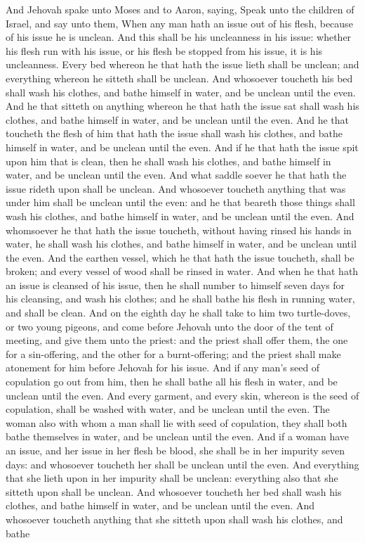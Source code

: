 And Jehovah spake unto Moses and to Aaron, saying, Speak unto the children of Israel, and say unto them, When any man hath an issue out of his flesh, because of his issue he is unclean. And this shall be his uncleanness in his issue: whether his flesh run with his issue, or his flesh be stopped from his issue, it is his uncleanness. Every bed whereon he that hath the issue lieth shall be unclean; and everything whereon he sitteth shall be unclean. And whosoever toucheth his bed shall wash his clothes, and bathe himself in water, and be unclean until the even. And he that sitteth on anything whereon he that hath the issue sat shall wash his clothes, and bathe himself in water, and be unclean until the even. And he that toucheth the flesh of him that hath the issue shall wash his clothes, and bathe himself in water, and be unclean until the even. And if he that hath the issue spit upon him that is clean, then he shall wash his clothes, and bathe himself in water, and be unclean until the even. And what saddle soever he that hath the issue rideth upon shall be unclean. And whosoever toucheth anything that was under him shall be unclean until the even: and he that beareth those things shall wash his clothes, and bathe himself in water, and be unclean until the even. And whomsoever he that hath the issue toucheth, without having rinsed his hands in water, he shall wash his clothes, and bathe himself in water, and be unclean until the even. And the earthen vessel, which he that hath the issue toucheth, shall be broken; and every vessel of wood shall be rinsed in water.  And when he that hath an issue is cleansed of his issue, then he shall number to himself seven days for his cleansing, and wash his clothes; and he shall bathe his flesh in running water, and shall be clean. And on the eighth day he shall take to him two turtle-doves, or two young pigeons, and come before Jehovah unto the door of the tent of meeting, and give them unto the priest: and the priest shall offer them, the one for a sin-offering, and the other for a burnt-offering; and the priest shall make atonement for him before Jehovah for his issue.  And if any man’s seed of copulation go out from him, then he shall bathe all his flesh in water, and be unclean until the even. And every garment, and every skin, whereon is the seed of copulation, shall be washed with water, and be unclean until the even. The woman also with whom a man shall lie with seed of copulation, they shall both bathe themselves in water, and be unclean until the even.  And if a woman have an issue, and her issue in her flesh be blood, she shall be in her impurity seven days: and whosoever toucheth her shall be unclean until the even. And everything that she lieth upon in her impurity shall be unclean: everything also that she sitteth upon shall be unclean. And whosoever toucheth her bed shall wash his clothes, and bathe himself in water, and be unclean until the even. And whosoever toucheth anything that she sitteth upon shall wash his clothes, and bathe 